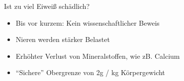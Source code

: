 \documentclass[xcolor=dvipsnames]{beamer}
\begin{document}
\begin{frame}[allowframebreaks]
        \framebreak

        \begin{block}{Ist zu viel Eiweiß schädlich?}
            \begin{itemize}
                \setlength\itemsep{1em}
                \item Bis vor kurzem: Kein wissenschaftlicher Beweis
                \item Nieren werden stärker Belastet
                \item Erhöhter Verlust von Mineralstoffen, wie zB. Calcium
                \item "`Sichere"' Obergrenze von 2g / kg Körpergewicht
            \end{itemize}
        \end{block}
    \end{frame}
\end{document}
